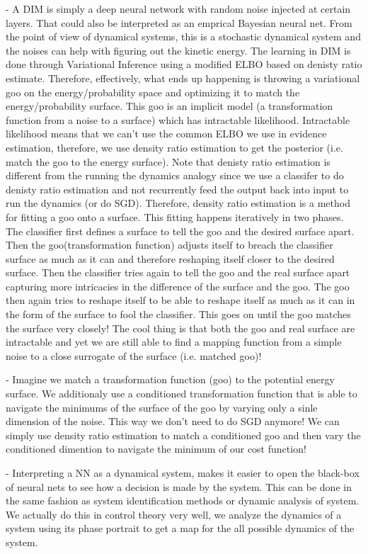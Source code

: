 \documentclass[aps,preprint,showpacs,superscriptaddress,groupedaddress]{revtex4}  %
\begin{document}
- A DIM is simply a deep neural network with random noise injected at certain layers. That could also be interpreted as an emprical Bayesian neural net. From the point of view of dynamical systems, this is a stochastic dynamical system and the noises can help with figuring out the kinetic energy. The learning in DIM is done through Variational Inference using a modified ELBO based on denisty ratio estimate. Therefore, effectively, what ends up happening is throwing a variational goo on the energy/probability space and optimizing it to match the energy/probability surface. This goo is an implicit model (a transformation function from a noise to a surface) which has intractable likelihood. Intractable likelihood means that we can't use the common ELBO we use in evidence estimation, therefore, we use density ratio estimation to get the posterior (i.e. match the goo to the energy surface). Note that denisty ratio estimation is different from the running the dynamics analogy since we use a classifer to do denisty ratio estimation and not recurrently feed the output back into input to run the dynamics (or do SGD). Therefore, density ratio estimation is a method for fitting a goo onto a surface. This fitting happens iteratively in two phases. The classifier first defines a surface to tell the goo and the desired surface apart. Then the goo(transformation function) adjusts itself to breach the classifier surface as much as it can and therefore reshaping itself closer to the desired surface. Then the classifier tries again to tell the goo and the real surface apart capturing more intricacies in the difference of the surface and the goo. The goo then again tries to reshape itself to be able to reshape itself as much as it can in the form of the surface to fool the classifier. This goes on until the goo matches the surface very closely! The cool thing is that both the goo and real surface are intractable and yet we are still able to find a mapping function from a simple noise to a close surrogate of the surface (i.e. matched goo)!

- Imagine we match a transformation function (goo) to the potential energy surface. We additionaly use a conditioned transformation function that is able to navigate the minimums of the surface of the goo by varying only a sinle dimension of the noise. This way we don't need to do SGD anymore! We can simply use density ratio estimation to match a conditioned goo and then vary the conditioned dimention to navigate the minimum of our cost function! 

- Interpreting a NN as a dynamical system, makes it easier to open the black-box of neural nets to see how a decision is made by the system. This can be done in the same fashion as system identification methods or dynamic analysis of system. We actually do this in control theory very well, we analyze the dynamics of a system using its phase portrait to get a map for the all possible dynamics of the system. 
\end{document}
